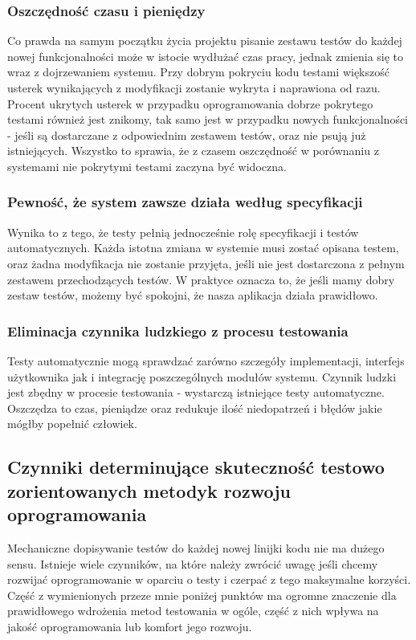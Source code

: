   \subsubsection{Oszczędność czasu i pieniędzy}
  Co prawda na samym początku życia projektu pisanie zestawu testów do każdej nowej funkcjonalności może w istocie wydłużać czas pracy, jednak zmienia się to wraz z dojrzewaniem systemu. Przy dobrym pokryciu kodu testami większość usterek wynikających z modyfikacji zostanie wykryta i naprawiona od razu. Procent ukrytych usterek w przypadku oprogramowania dobrze pokrytego testami również jest znikomy, tak samo jest w przypadku nowych funkcjonalności - jeśli są dostarczane z odpowiednim zestawem testów, oraz nie psują już istniejących. Wszystko to sprawia, że z czasem oszczędność w porównaniu z systemami nie pokrytymi testami zaczyna być widoczna.
  
  \subsubsection{Pewność, że system zawsze działa według specyfikacji}
  Wynika to z tego, że testy pełnią jednocześnie rolę specyfikacji i testów automatycznych. Każda istotna zmiana w systemie musi zostać opisana testem, oraz żadna modyfikacja nie zostanie przyjęta, jeśli nie jest dostarczona z pełnym zestawem przechodzących testów. W praktyce oznacza to, że jeśli mamy dobry zestaw testów, możemy być spokojni, że nasza aplikacja działa prawidłowo.
  
  \subsubsection{Eliminacja czynnika ludzkiego z procesu testowania}
  Testy automatycznie mogą sprawdzać zarówno szczegóły implementacji, interfejs użytkownika jak i integrację poszczególnych modułów systemu. Czynnik ludzki jest zbędny w procesie testowania - wystarczą istniejące testy automatyczne. Oszczędza to czas, pieniądze oraz redukuje ilość niedopatrzeń i błędów jakie mógłby popełnić człowiek.
    
  \subsection{Czynniki determinujące skuteczność testowo zorientowanych metodyk rozwoju oprogramowania}
  Mechaniczne dopisywanie testów do każdej nowej linijki kodu nie ma dużego sensu. Istnieje wiele czynników, na które należy zwrócić uwagę jeśli chcemy rozwijać oprogramowanie w oparciu o testy i czerpać z tego maksymalne korzyści. Część z wymienionych przeze mnie poniżej punktów ma ogromne znaczenie dla prawidłowego wdrożenia metod testowania w ogóle, część z nich wpływa na jakość oprogramowania lub komfort jego rozwoju.
  
